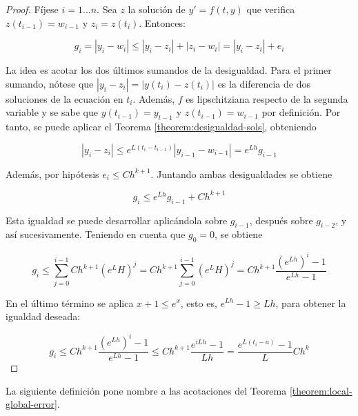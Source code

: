 \documentclass{article}
\theoremstyle{theorem-style}  %
\theoremstyle{definition-style}
\theoremstyle{example-style}
\begin{document}
	\begin{proof}
		Fíjese $i = 1 \ldots n$. Sea $z$ la solución de $y' = f(t, y)$ que verifica $z(t_{i-1}) = w_{i-1}$ y $z_i = z(t_i)$. Entonces:
		
		\begin{equation*}
			g_i = |y_i - w_i| \le |y_i - z_i| + |z_i - w_i| = |y_i - z_i| + e_i 
		\end{equation*}
		
		La idea es acotar los dos últimos sumandos de la desigualdad.  Para el primer sumando, nótese que $|y_i - z_i| = |y(t_i) - z(t_i)|$ es la diferencia de dos soluciones de la ecuación en $t_i$. Además, $f$ es lipschitziana respecto de la segunda variable y se sabe que $y(t_{i-1}) = y_{t-1}$ y $z(t_{i-1}) = w_{i-1}$ por definición. Por tanto, se puede aplicar el Teorema \ref{theorem:desigualdad-sols}, obteniendo
		
		\begin{equation*}
			|y_i - z_i| \le e^{L(t_i - t_{i-1})} |y_{i-1} - w_{i-1}| = e^{Lh} g_{i-1}
		\end{equation*}
		
		
		Además, por hipótesis $e_i \le C h^{k+1}$. Juntando ambas desigualdades se obtiene

		\begin{equation*}
			g_i \le e^{Lh} g_{i-1} + C h^{k+1}
		\end{equation*}

		Esta igualdad se puede desarrollar aplicándola sobre $g_{i-1}$, después sobre $g_{i-2}$, y así sucesivamente. Teniendo en cuenta que $g_0 = 0$, se obtiene
		
		\begin{equation*}
			g_i \le \sum_{j = 0}^{i-1} Ch^{k+1} \left(e^LH\right)^j = Ch^{k+1} \sum_{j = 0}^{i-1} \left(e^LH\right)^j = Ch^{k+1} \frac{\left(e^{Lh}\right)^i - 1}{e^{Lh} - 1}
		\end{equation*}

		En el último término se aplica $x + 1 \le e^{x}$, esto es, $e^{Lh} - 1 \ge Lh$, para obtener la igualdad deseada:

		\begin{equation*}
			g_i \le Ch^{k+1} \frac{\left(e^{Lh}\right)^i - 1}{e^{Lh} - 1} \le Ch^{k+1} \frac{e^{iLh} - 1}{Lh} = \frac{e^{L(t_i - a)} - 1}{L} C h^{k} 
		\end{equation*}
	\end{proof}

	La siguiente definición pone nombre a las acotaciones del Teorema \ref{theorem:local-global-error}.
\end{document}

